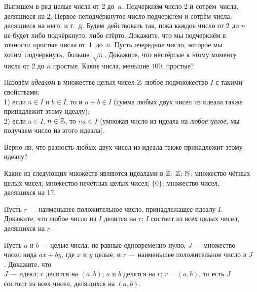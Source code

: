 \documentclass[a4paper,11pt]{article}
\begin{document}
\def\a{\alpha}




\!\!\!\! \!\!\!
Выпишем в ряд целые числа от 2 до~$n$. Подчеркн\"ем число
2 и сотр\"ем~\hbox{числа,} делящиеся на 2.
Первое неподч\"еркнутое число подчеркн\"ем и сотр\"ем %
числа, делящиеся на него, и т.~д.
Будем~действовать так, пока каждое число от 2 до $n$
не будет либо подч\"еркнуто, либо ст\"ерто.
Докажите, что мы подчерк\-н\"ем в точности простые числа
от~1~до~$n$.\!
\!\!\! Пусть очередное число, которое мы хотим~\hbox{подчеркнуть, больше $\sqrt{n}$.}
Докажите, что не\-ст\"ер\-тые к этому моменту числа от 2 до $n$ простые.
 Какие числа, меньшие $100$, простые?

Назовём {\it идеалом} в множестве целых чисел $\mathbb{Z}$ любое подмножество $I$ с такими свойствами:\\
1) если $a\in I$ и $b\in I$, то и $a+b\in I$ (сумма любых двух чисел из идеала также принадлежит этому идеалу);\\
2) если $a\in I$, $n\in \mathbb{Z}$, то $na\in I$ (умножая число из идеала на {\it любое целое}, мы получаем число из этого идеала).

Верно ли, что разность любых двух чисел из идеала также принадлежит этому идеалу?

Какие из следующих множеств являются идеалами в $\mathbb{Z}$:
 $\mathbb{Z}$;
 $\mathbb{N}$;
 множество чётных целых чисел;
 множество нечётных целых чисел;
 $\{0\}$:
 множество чисел, делящихся на 17.

Пусть $r$ --- наименьшее положительное число, принадлежащее идеалу $I$. Докажите, что 
 любое число из $I$ делится на $r$; 
 $I$ состоит из всех целых чисел, делящихся на $r$.

Пусть $a$ и $b$ --- целые числа, не равные одновременно нулю, $J$ --- множество чисел вида $ax+by$, где $x$ и $y$ целые, и $r$ --- наименьшее положительное число в $J$.
Докажите, что\\
 $J$ --- идеал;
 $r$ делится на $(a,b)$; 
 $a$ и $b$ делятся на $r$;
 $r=(a,b)$, то есть $J$ состоит из всех чисел, делящихся на $(a,b)$.
\end{document}

